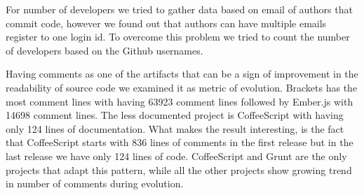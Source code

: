 \vspace{5 mm}
\noindent{\rqiii}
\vspace{5 mm}

\par For number of developers we tried to gather data based on email of authors that commit code, however we found out that authors can have multiple emails register to one login id. To overcome this problem we tried to count the number of developers based on the Github usernames. 

\par
Having comments as one of the artifacts that can be a sign of improvement in the readability of source code we examined it as metric of evolution.
Brackets has the most comment lines with having 63923 comment lines followed by Ember.js with 14698 comment lines. The less documented project is CoffeeScript with having only 124 lines of documentation. What makes the result interesting, is the fact that CoffeeScript starts with 836 lines of comments in the first release but in the last release we have only 124 lines of code. CoffeeScript and Grunt are the only projects that adapt this pattern, while all the other projects show growing trend in number of comments during evolution.  


